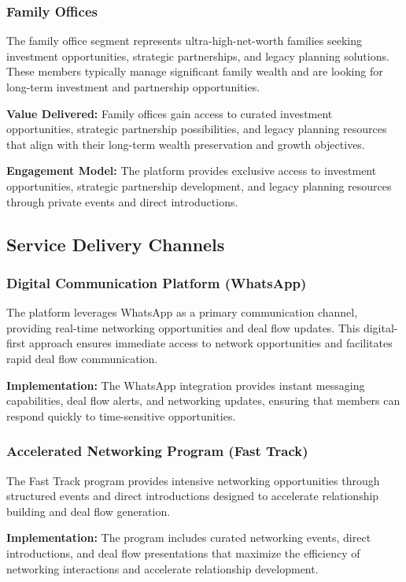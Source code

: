 \subsubsection{Family Offices}
The family office segment represents ultra-high-net-worth families seeking investment opportunities, strategic partnerships, and legacy planning solutions. These members typically manage significant family wealth and are looking for long-term investment and partnership opportunities.

\textbf{Value Delivered:} Family offices gain access to curated investment opportunities, strategic partnership possibilities, and legacy planning resources that align with their long-term wealth preservation and growth objectives.

\textbf{Engagement Model:} The platform provides exclusive access to investment opportunities, strategic partnership development, and legacy planning resources through private events and direct introductions.

\subsection{Service Delivery Channels}

\subsubsection{Digital Communication Platform (WhatsApp)}
The platform leverages WhatsApp as a primary communication channel, providing real-time networking opportunities and deal flow updates. This digital-first approach ensures immediate access to network opportunities and facilitates rapid deal flow communication.

\textbf{Implementation:} The WhatsApp integration provides instant messaging capabilities, deal flow alerts, and networking updates, ensuring that members can respond quickly to time-sensitive opportunities.

\subsubsection{Accelerated Networking Program (Fast Track)}
The Fast Track program provides intensive networking opportunities through structured events and direct introductions designed to accelerate relationship building and deal flow generation.

\textbf{Implementation:} The program includes curated networking events, direct introductions, and deal flow presentations that maximize the efficiency of networking interactions and accelerate relationship development.

